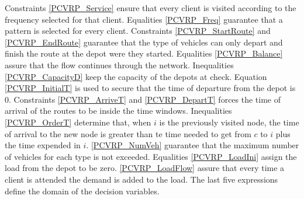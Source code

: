 \documentclass[preprint,review,12pt]{elsarticle}
\begin{document}
Constraints \eqref{PCVRP_Service} ensure that every client is visited according to the frequency selected for that client. Equalities \eqref{PCVRP_Freq} guarantee that a pattern is selected for every client. Constraints \eqref{PCVRP_StartRoute} and \eqref{PCVRP_EndRoute} guarantee that the type of vehicles can only depart and finish the route at the depot were they started. Equalities \eqref{PCVRP_Balance} assure that the flow continues through the network. Inequalities \eqref{PCVRP_CapacityD} keep the capacity of the depots at check. Equation \eqref{PCVRP_InitialT} is used to secure that the time of departure from the depot is 0. Constraints \eqref{PCVRP_ArriveT} and \eqref{PCVRP_DepartT} forces the time of arrival of the routes to be inside the time windows. Inequalities \eqref{PCVRP_OrderT} determine that, when $i$ is the previously visited node, the time of arrival to the new node is greater than te time needed to get from $c$ to $i$ plus the time expended in $i$. \eqref{PCVRP_NumVeh} guarantee that the maximum number of vehicles for each type is not exceeded. Equalities \eqref{PCVRP_LoadIni} assign the load from the depot to be zero. \eqref{PCVRP_LoadFlow} assure that every time a client is attended the demand is added to the load. The last five expressions define the domain of the decision variables.
\end{document}
